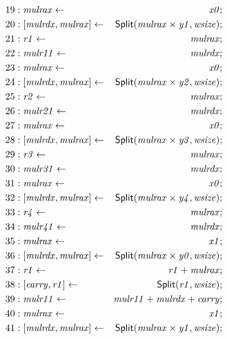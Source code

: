 {\begin{multicols}{2}
\begin{align*}
19 &: \mathit{mulrax} \leftarrow & \mathit{x0}; \\
20 &: \concat{\mathit{mulrdx}}{\mathit{mulrax}} \leftarrow & \dslcode{Split}(\mathit{mulrax} \times \mathit{y1}, \mathit{wsize}); \\
21 &: \mathit{r1} \leftarrow & \mathit{mulrax}; \\
22 &: \mathit{mulr11} \leftarrow & \mathit{mulrdx}; \\
23 &: \mathit{mulrax} \leftarrow & \mathit{x0}; \\
24 &: \concat{\mathit{mulrdx}}{\mathit{mulrax}} \leftarrow & \dslcode{Split}(\mathit{mulrax} \times \mathit{y2}, \mathit{wsize}); \\
25 &: \mathit{r2} \leftarrow & \mathit{mulrax}; \\
26 &: \mathit{mulr21} \leftarrow & \mathit{mulrdx}; \\
27 &: \mathit{mulrax} \leftarrow & \mathit{x0}; \\
28 &: \concat{\mathit{mulrdx}}{\mathit{mulrax}} \leftarrow & \dslcode{Split}(\mathit{mulrax} \times \mathit{y3}, \mathit{wsize}); \\
29 &: \mathit{r3} \leftarrow & \mathit{mulrax}; \\
30 &: \mathit{mulr31} \leftarrow & \mathit{mulrdx}; \\
31 &: \mathit{mulrax} \leftarrow & \mathit{x0}; \\
32 &: \concat{\mathit{mulrdx}}{\mathit{mulrax}} \leftarrow & \dslcode{Split}(\mathit{mulrax} \times \mathit{y4}, \mathit{wsize}); \\
33 &: \mathit{r4} \leftarrow & \mathit{mulrax}; \\
34 &: \mathit{mulr41} \leftarrow & \mathit{mulrdx}; \\
35 &: \mathit{mulrax} \leftarrow & \mathit{x1}; \\
36 &: \concat{\mathit{mulrdx}}{\mathit{mulrax}} \leftarrow & \dslcode{Split}(\mathit{mulrax} \times \mathit{y0}, \mathit{wsize}); \\
37 &: \mathit{r1} \leftarrow & \mathit{r1} + \mathit{mulrax}; \\
38 &: \concat{\mathit{carry}}{\mathit{r1}} \leftarrow & \dslcode{Split}(\mathit{r1}, \mathit{wsize}); \\
39 &: \mathit{mulr11} \leftarrow & \mathit{mulr11} + \mathit{mulrdx} + \mathit{carry}; \\
40 &: \mathit{mulrax} \leftarrow & \mathit{x1}; \\
41 &: \concat{\mathit{mulrdx}}{\mathit{mulrax}} \leftarrow & \dslcode{Split}(\mathit{mulrax} \times \mathit{y1}, \mathit{wsize}); \\

\end{align*}
\end{multicols}}
